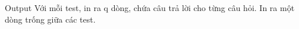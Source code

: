 Output
Với mỗi test, in ra q dòng, chứa câu trả lời cho từng câu hỏi. In ra một dòng trống giữa các test.